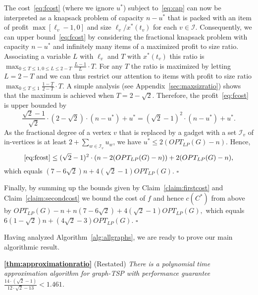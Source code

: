\documentclass[letterpaper,11pt]{article}
\newenvironment{proofclaim}{\begin{trivlist}
\item[\hskip\labelsep {\it Proof of Claim}.]}{\QED \end{trivlist}}
\newenvironment{proof}{\begin{trivlist}
\item[\hskip\labelsep {\bf Proof}.]}{\QED \end{trivlist}}
\newenvironment{apptheorem}{\begin{trivlist}
        \item[\hskip\labelsep {\bf Theorem}]}{ \end{trivlist}}
\newcommand{\QED}{\hfill $\square$}
\newcommand{\OLP}[1]{\ensuremath{OPT_{LP}(#1)}}
\newcommand{\TSP}{graph-TSP\xspace}
\begin{document}
\begin{proof}
\begin{proofclaim}
The cost~\eqref{eq:fcost} (where we ignore $u^*$) subject
to~\eqref{eq:cap} can now be interpreted as a knapsack problem of
capacity $n - u^*$ that is packed with an item of profit $ \max[\ell_v
-1, 0]$ and size $\ell_v/x^*(t_v)$ for each $v\in
\mathcal{I}$. Consequently, we can upper bound~\eqref{eq:fcost} by
considering the fractional knapsack problem with capacity $n-u^*$ and
infinitely many items of a maximized profit to size ratio. Associating
a variable $L$ with $\ell_v$ and $T$ with $x^*(t_v)$ this ratio is $
\max_{0\leq T \leq 1,0\leq L \leq 2 - T} \frac{L-1}{L}\cdot T.$ For
any $T$ the ratio is maximized by letting $L=2-T$ and we can thus
restrict our attention to items with profit to size ratio
$\max_{0\leq T \leq 1} \frac{1-T}{2-T} \cdot T$. A simple analysis (see Appendix~\ref{sec:maxsizratio})
shows that the maximum is achieved when $T= 2-
\sqrt{2}$. Therefore, the profit~\eqref{eq:fcost} is upper bounded by
$$
 \frac{\sqrt{2} -1}{\sqrt{2}} \cdot(2- \sqrt{2})\cdot (n-u^*) +u^* = (\sqrt{2}-1)^2 \cdot (n-u^*) + u^*.
$$
As the fractional degree of a vertex $v$ that is replaced by a gadget
with a set $\mathcal{I}_v$ of in-vertices is at least $2+\sum_{w\in
  \mathcal{I}_v} u_w$, we have $u^* \leq 2(\OLP{G}-n)$. Hence,
$$
\eqref{eq:fcost} \leq  (\sqrt{2}-1)^2 \cdot (n-2(\OLP{G}-n)) + 2(\OLP{G}-n),
$$
which equals $(7-6\sqrt{2})n + 4(\sqrt{2}-1)\OLP{G}$.
\end{proofclaim}
Finally, by summing up the bounds given by Claim~\ref{claim:firstcost}
and Claim~\ref{claim:secondcost} we bound the cost of $f$ and hence $c(C^*)$ from above by
$
 \OLP{G}-n + n(7-6\sqrt{2}) + 4(\sqrt{2}-1)\OLP{G},
$
which equals $6(1-\sqrt{2})n + (4\sqrt{2} -3)\OLP{G}$.
\end{proof}

Having analyzed Algorithm~\ref{alg:allgraphs}, we are ready to prove our main algorithmic result.
\begin{apptheorem}{\textbf{\ref{thm:approximationratio}}} (Restated)\emph{ 
  There is a polynomial time approximation algorithm for \TSP with
  performance guarantee $\frac{14\cdot( \sqrt{2}-1)}{12\cdot
    \sqrt{2}-13} < 1.461$.}
\end{apptheorem}
\end{document}
